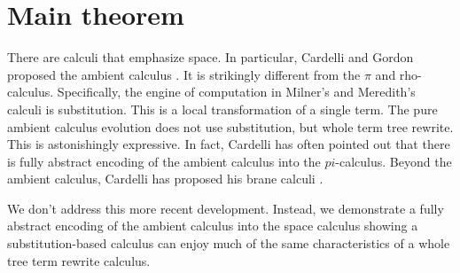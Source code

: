 \section{Main theorem}
There are calculi that emphasize space. In particular, Cardelli and
Gordon proposed the ambient calculus \cite{DBLP:journals/entcs/CardelliG97}. It is strikingly different from
the $\pi$ and rho-calculus. Specifically, the engine of computation in
Milner's and Meredith's calculi is substitution. This is a local
transformation of a single term. The pure ambient calculus evolution
does not use substitution, but whole term tree rewrite. This is
astonishingly expressive. In fact, Cardelli has often pointed out that
there is fully abstract encoding of the ambient calculus into the
$pi$-calculus. Beyond the ambient calculus, Cardelli has proposed his brane calculi \cite{DBLP:conf/cmsb/Cardelli04}.

We don't address this more recent development. Instead, we demonstrate
a fully abstract encoding of the ambient calculus into the space
calculus showing a substitution-based calculus can enjoy much of the same characteristics of a whole tree term rewrite calculus.


